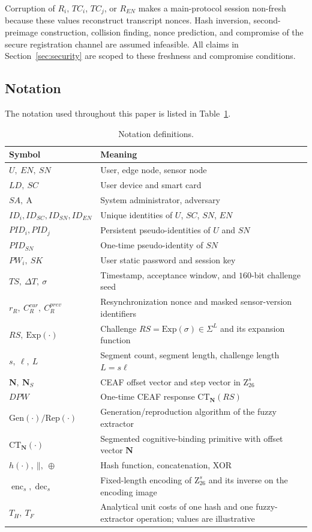\documentclass[cmc,article,submit,moreauthors,pdftex]{Definitions/tsp}
\renewcommand{\mathsf}[1]{\mathrm{#1}}
\renewcommand{\mathcal}[1]{\mathrm{#1}}
\renewcommand{\mathbb}[1]{\mathrm{#1}}
\newcommand{\cc}{\mathbin{\|}}
\newcommand{\CT}{\mathsf{CT}}
\newcommand{\Gen}{\mathrm{Gen}}
\newcommand{\Rep}{\mathrm{Rep}}
\newcommand{\advA}{\mathcal{A}}
\begin{document}
Corruption of $R_i$, $TC_i$, $TC_j$, or $R_{EN}$ makes a main-protocol session non-fresh because these values reconstruct transcript nonces. Hash inversion, second-preimage construction, collision finding, nonce prediction, and compromise of the secure registration channel are assumed infeasible. All claims in Section~\ref{sec:security} are scoped to these freshness and compromise conditions.

\subsection{Notation}

The notation used throughout this paper is listed in Table~\ref{tab:notation}.

\begin{table}[t]
\caption{Notation definitions.}
\label{tab:notation}
\begin{tabularx}{\textwidth}{lX}
\toprule
\textbf{Symbol} & \textbf{Meaning}\\
\midrule
$U,\ EN,\ SN$ & User, edge node, sensor node\\
$LD,\ SC$ & User device and smart card\\
$SA,\ \advA$ & System administrator, adversary\\
$ID_i, ID_{SC}, ID_{SN}, ID_{EN}$ & Unique identities of $U$, $SC$, $SN$, $EN$\\
$PID_i, PID_j$ & Persistent pseudo-identities of $U$ and $SN$\\
$PID_{SN}$ & One-time pseudo-identity of $SN$\\
$PW_i,\ SK$ & User static password and session key\\
$TS,\ \Delta T,\ \sigma$ & Timestamp, acceptance window, and $160$-bit challenge seed\\
$r_R,\ C_R^{cur},\ C_R^{prev}$ & Resynchronization nonce and masked sensor-version identifiers\\
$RS,\ \mathsf{Exp}(\cdot)$ & Challenge $RS=\mathsf{Exp}(\sigma)\in\Sigma^{L}$ and its expansion function\\
$s,\ \ell,\ L$ & Segment count, segment length, challenge length $L=s\ell$\\
$\mathbf{N},\ \mathbf{N}_S$ & CEAF offset vector and step vector in $\mathbb{Z}_{26}^{s}$\\
$DPW$ & One-time CEAF response $\CT_{\mathbf{N}}(RS)$\\
$\Gen(\cdot)/\Rep(\cdot)$ & Generation/reproduction algorithm of the fuzzy extractor\\
$\CT_{\mathbf{N}}(\cdot)$ & Segmented cognitive-binding primitive with offset vector $\mathbf{N}$\\
$h(\cdot),\ \cc,\ \oplus$ & Hash function, concatenation, XOR\\
$\operatorname{enc}_s,\operatorname{dec}_s$ & Fixed-length encoding of $\mathbb{Z}_{26}^{s}$ and its inverse on the encoding image\\
$T_H,\ T_F$ & Analytical unit costs of one hash and one fuzzy-extractor operation; values are illustrative\\
\bottomrule
\end{tabularx}
\end{table}
\end{document}
